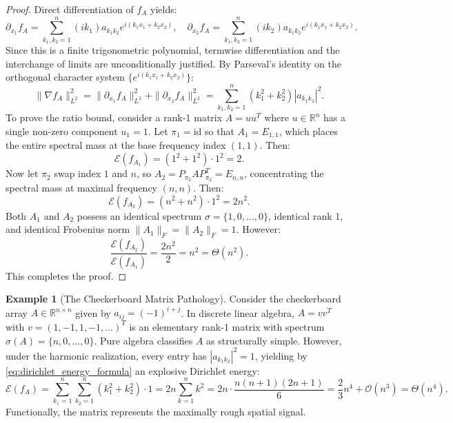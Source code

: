 \documentclass[11pt,a4paper,reqno]{amsart}
\theoremstyle{definition}
\newtheorem{example}[theorem]{Example}
\numberwithin{equation}{section}
\providecommand{\R}{\mathbb{R}}
\providecommand{\R}{\mathbb{R}}
\begin{document}
\begin{proof}
Direct differentiation of $f_A$ yields:
\begin{equation}
    \partial_{x_1} f_A = \sum_{k_1, k_2=1}^n (i k_1) a_{k_1 k_2} e^{i(k_1 x_1 + k_2 x_2)}, \quad
    \partial_{x_2} f_A = \sum_{k_1, k_2=1}^n (i k_2) a_{k_1 k_2} e^{i(k_1 x_1 + k_2 x_2)}.
\end{equation}
Since this is a finite trigonometric polynomial, termwise differentiation and the interchange of limits are unconditionally justified. By Parseval's identity on the orthogonal character system $\{e^{i(k_1 x_1 + k_2 x_2)}\}$:
\begin{equation}
    \|\nabla f_A\|_{L^2}^2 = \|\partial_{x_1} f_A\|_{L^2}^2 + \|\partial_{x_2} f_A\|_{L^2}^2 = \sum_{k_1, k_2=1}^n (k_1^2 + k_2^2) |a_{k_1 k_2}|^2.
\end{equation}
To prove the ratio bound, consider a rank-1 matrix $A = u u^T$ where $u \in \R^n$ has a single non-zero component $u_1 = 1$. Let $\pi_1 = \mathrm{id}$ so that $A_1 = E_{1,1}$, which places the entire spectral mass at the base frequency index $(1, 1)$. Then:
\begin{equation}
    \mathcal{E}(f_{A_1}) = (1^2 + 1^2) \cdot 1^2 = 2.
\end{equation}
Now let $\pi_2$ swap index $1$ and $n$, so $A_2 = P_{\pi_2} A P_{\pi_2}^T = E_{n, n}$, concentrating the spectral mass at maximal frequency $(n, n)$. Then:
\begin{equation}
    \mathcal{E}(f_{A_2}) = (n^2 + n^2) \cdot 1^2 = 2n^2.
\end{equation}
Both $A_1$ and $A_2$ possess an identical spectrum $\sigma = \{1, 0, \dots, 0\}$, identical rank 1, and identical Frobenius norm $\|A_1\|_F = \|A_2\|_F = 1$. However:
\begin{equation}
    \frac{\mathcal{E}(f_{A_2})}{\mathcal{E}(f_{A_1})} = \frac{2n^2}{2} = n^2 = \Theta(n^2).
\end{equation}
This completes the proof.
\end{proof}

\begin{example}[The Checkerboard Matrix Pathology]
Consider the checkerboard array $A \in \R^{n \times n}$ given by $a_{ij} = (-1)^{i+j}$. In discrete linear algebra, $A = v v^T$ with $v = (1, -1, 1, -1, \dots)^T$ is an elementary rank-1 matrix with spectrum $\sigma(A) = \{n, 0, \dots, 0\}$. Pure algebra classifies $A$ as structurally simple. However, under the harmonic realization, every entry has $|a_{k_1 k_2}|^2 = 1$, yielding by \eqref{eq:dirichlet_energy_formula} an explosive Dirichlet energy:
\begin{equation}
    \mathcal{E}(f_A) = \sum_{k_1=1}^n \sum_{k_2=1}^n (k_1^2 + k_2^2) \cdot 1 = 2n \sum_{k=1}^n k^2 = 2n \cdot \frac{n(n+1)(2n+1)}{6} = \frac{2}{3} n^4 + \mathcal{O}(n^3) = \Theta(n^4).
\end{equation}
Functionally, the matrix represents the maximally rough spatial signal.
\end{example}
\end{document}

